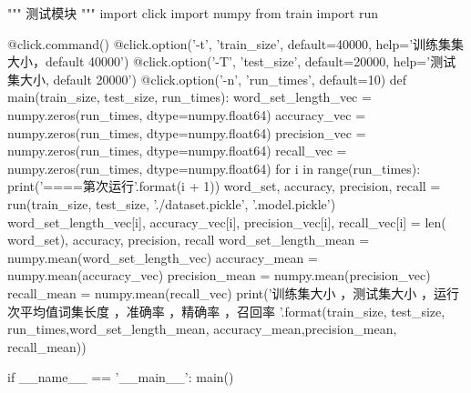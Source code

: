 \documentclass[UTF8,zihao=-4]{ctexart}
\begin{document}
\begin{python}
"""
测试模块
"""
import click
import numpy
from train import run


@click.command()
@click.option('-t', 'train_size', default=40000, help='训练集集大小，default 40000')
@click.option('-T', 'test_size', default=20000, help='测试集大小, default 20000')
@click.option('-n', 'run_times', default=10)
def main(train_size, test_size, run_times):
    word_set_length_vec = numpy.zeros(run_times, dtype=numpy.float64)
    accuracy_vec = numpy.zeros(run_times, dtype=numpy.float64)
    precision_vec = numpy.zeros(run_times, dtype=numpy.float64)
    recall_vec = numpy.zeros(run_times, dtype=numpy.float64)
    for i in range(run_times):
        print('====第{}次运行'.format(i + 1))
        word_set, accuracy, precision, recall = run(train_size, test_size, './dataset.pickle', '.model.pickle')
        word_set_length_vec[i], accuracy_vec[i], precision_vec[i], recall_vec[i] = len(
            word_set), accuracy, precision, recall
    word_set_length_mean = numpy.mean(word_set_length_vec)
    accuracy_mean = numpy.mean(accuracy_vec)
    precision_mean = numpy.mean(precision_vec)
    recall_mean = numpy.mean(recall_vec)
    print('训练集大小 {}，测试集大小 {}，运行 {} 次平均值词集长度 {}，准确率 {}，精确率 {}，召回率 {}'.format(train_size, test_size, run_times,word_set_length_mean, accuracy_mean,precision_mean, recall_mean))


if __name__ == '__main__':
    main()
\end{python}
\end{document}
